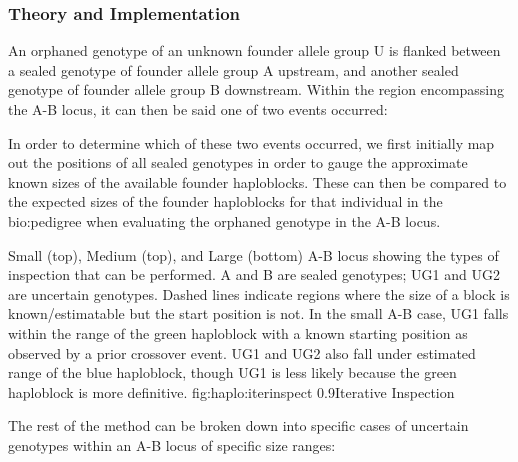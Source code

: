 \subsubsection{Theory and Implementation}

An orphaned genotype of an unknown founder allele group U is flanked between a sealed genotype of founder allele group A upstream, and another sealed genotype of founder allele group B downstream. Within the region encompassing the A-B locus, it can then be said one of two events occurred:

\begin{description}
\end{description}

In order to determine which of these two events occurred, we first initially map out the positions of all sealed genotypes in order to gauge the approximate known sizes of the available founder haploblocks. These can then be compared to the expected sizes of the founder haploblocks for that individual in the \gls{bio:pedigree} when evaluating the orphaned genotype in the A-B locus.

	{Small (top), Medium (top), and Large (bottom) A-B locus showing the types of inspection that can be performed. A and B are sealed genotypes; UG1 and UG2 are uncertain genotypes. Dashed lines indicate regions where the size of a block is known/estimatable but the start position is not. In the small A-B case, UG1 falls within the range of the green haploblock with a known starting position as observed by a prior crossover event. UG1 and UG2 also fall under estimated range of the blue haploblock, though UG1 is less likely because the green haploblock is more definitive.}
	{fig:haplo:iterinspect}
	{0.9}{Iterative Inspection}

The rest of the method can be broken down into specific cases of uncertain genotypes within an A-B locus of specific size ranges:

